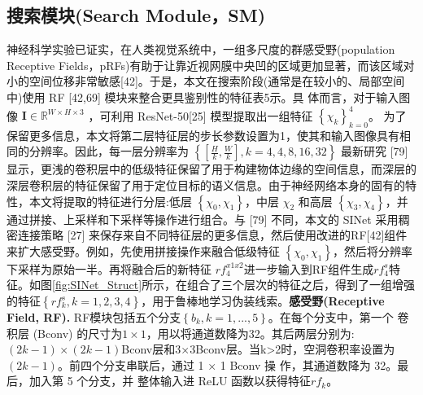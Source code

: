 \documentclass[final]{cvpr}
\renewcommand{\figref}[1]{图\ref{#1}}
\begin{document}
\subsection{搜索模块(Search Module，SM)}
神经科学实验已证实，在人类视觉系统中，一组多尺度的群感受野(population Receptive Fields，pRFs)有助于让靠近视网膜中央凹的区域更加显著，而该区域对小的空间位移非常敏感[42]。于是，本文在搜索阶段(通常是在较小的、局部空间中)使用 RF [42,69] 模块来整合更具鉴别性的特征表5示。具 体而言，对于输入图像 
$\mathbf{I} \in \mathbb{R}^{W\times H\times3 }$ %
，可利用 ResNet-50[25] 模型提取出一组特征
$\left \{ \chi_{k}  \right \}_{k=0}^{4}$。
为了保留更多信息，本文将第二层特征层的步长参数设置为1，使其和输入图像具有相同的分辨率。因此，每一层分辨率为
$\left \{ \left [  \frac{H}{k},\frac{W}{k}  \right ] , k=4,4,8,16,32\right \} $
最新研究 [79] 显示，更浅的卷积层中的低级特征保留了用于构建物体边缘的空间信息，而深层的深层卷积层的特征保留了用于定位目标的语义信息。由于神经网络本身的固有的特性，本文将提取的特征进行分层:低层 
$\left \{ \chi_{0},\chi_{1} \right \} $，中层 $\chi_{2}$ 和高层
$\left \{ \chi_{3},\chi_{4} \right \} $，并通过拼接、上采样和下采样等操作进行组合。与 [79] 不同，本文的 SINet 采用稠密连接策略 [27] 来保存来自不同特征层的更多信息，然后使用改进的RF[42]组件来扩大感受野。例如，先使用拼接操作来融合低级特征 
$\left \{ \chi_{0},\chi_{1} \right \} $，然后将分辨率下采样为原始一半。再将融合后的新特征
$rf_{4}^{x1x2} $进一步输入到RF组件生成$rf_{4}^{s}$特征。如\figref{fig:SINet_Struct}所示，在组合了三个层次的特征之后，得到了一组增强的特征$\left\{rf_{k}^{s},k=1,2,3,4\right\}$，用于鲁棒地学习伪装线索。\textbf{感受野(Receptive Field, RF). }RF模块包括五个分支$\left \{ b_{k} , k=1,...,5 \right \}$。在每个分支中，第一个 卷积层 (Bconv) 的尺寸为$1\times1$，用以将通道数降为32。其后两层分别为:$(2k-1)\times(2k-1)$Bconv层和3×3Bconv层。当k>2时，空洞卷积率设置为$(2k − 1)$。前四个分支串联后，通过 1 × 1 Bconv 操 作，其通道数降为 32。最后，加入第 5 个分支，并 整体输入进 ReLU 函数以获得特征$rf_{k}$。
\end{document}
